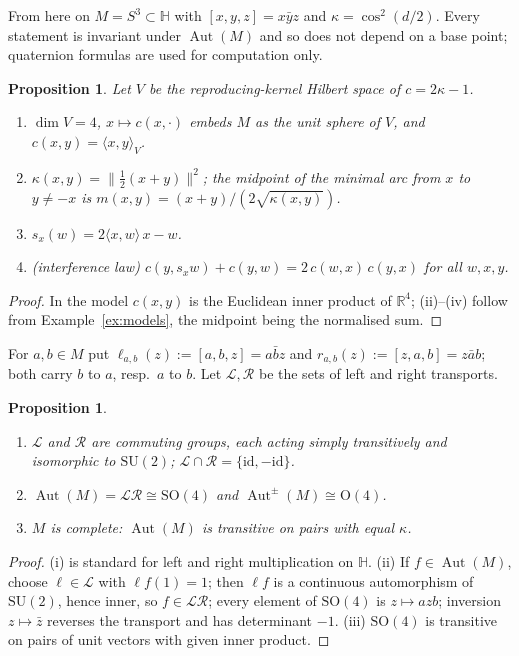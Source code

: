 \documentclass[11pt,reqno]{amsart}
\newtheorem{proposition}[theorem]{Proposition}
\theoremstyle{definition}
\theoremstyle{remark}
\numberwithin{equation}{section}
\newcommand{\R}{\mathbb{R}}
\newcommand{\HH}{\mathbb{H}}
\newcommand{\cL}{\mathcal{L}}
\newcommand{\cR}{\mathcal{R}}
\newcommand{\Aut}{\operatorname{Aut}}
\newcommand{\ip}[2]{\langle #1,#2\rangle}
\newcommand{\hp}[3]{[#1,#2,#3]}
\newcommand{\SU}{\mathrm{SU}}
\newcommand{\SO}{\mathrm{SO}}
\newcommand{\OO}{\mathrm{O}}
\begin{document}
From here on $M=S^3\subset\HH$ with $\hp xyz=x\bar yz$ and $\kappa=\cos^2(d/2)$.  Every statement is
invariant under $\Aut(M)$ and so does not depend on a base point; quaternion formulas are used for
computation only.

\begin{proposition}\label{prop:linear}
Let $V$ be the reproducing-kernel Hilbert space of $c=2\kappa-1$.
\begin{enumerate}[label=(\roman*)]
\item $\dim V=4$, $x\mapsto c(x,\cdot)$ embeds $M$ as the unit sphere of $V$, and $c(x,y)=\ip xy_V$.
\item $\kappa(x,y)=\lVert\tfrac12(x+y)\rVert^2$; the \emph{midpoint} of the minimal arc from $x$ to
$y\ne-x$ is $m(x,y)=(x+y)/(2\sqrt{\kappa(x,y)})$.
\item $s_x(w)=2\ip xw\,x-w$.
\item \emph{(interference law)} $c(y,s_xw)+c(y,w)=2\,c(w,x)\,c(y,x)$ for all $w,x,y$.
\end{enumerate}
\end{proposition}
\begin{proof}
In the model $c(x,y)$ is the Euclidean inner product of $\R^4$; (ii)--(iv) follow from
Example~\ref{ex:models}, the midpoint being the normalised sum.
\end{proof}

For $a,b\in M$ put $\ell_{a,b}(z):=\hp abz=a\bar bz$ and $r_{a,b}(z):=\hp zab=z\bar ab$; both carry $b$ to
$a$, resp.\ $a$ to $b$.  Let $\cL,\cR$ be the sets of left and right transports.

\begin{proposition}\label{prop:aut}
\begin{enumerate}[label=(\roman*)]
\item $\cL$ and $\cR$ are commuting groups, each acting simply transitively and isomorphic to $\SU(2)$;
$\cL\cap\cR=\{\mathrm{id},-\mathrm{id}\}$.
\item $\Aut(M)=\cL\cR\cong\SO(4)$ and $\Aut^\pm(M)\cong\OO(4)$.
\item $M$ is complete: $\Aut(M)$ is transitive on pairs with equal $\kappa$.
\end{enumerate}
\end{proposition}
\begin{proof}
(i) is standard for left and right multiplication on $\HH$.  (ii) If $f\in\Aut(M)$, choose $\ell\in\cL$
with $\ell f(1)=1$; then $\ell f$ is a continuous automorphism of $\SU(2)$, hence inner, so $f\in\cL\cR$;
every element of $\SO(4)$ is $z\mapsto azb$; inversion $z\mapsto\bar z$ reverses the transport and has
determinant $-1$.  (iii) $\SO(4)$ is transitive on pairs of unit vectors with given inner product.
\end{proof}
\end{document}
